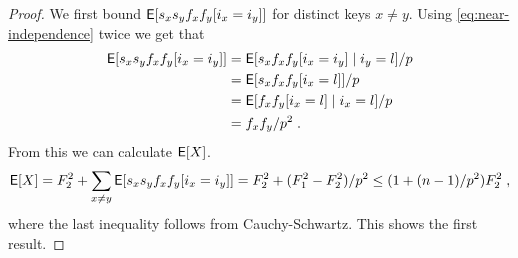\begin{proof}
    We first bound $\operatorname*{\sf{E}}[s_x s_y f_x f_y [i_x = i_y]]$ for distinct keys
    $x \neq y$. Using \cref{eq:near-independence} twice we get that
    \begin{equation}\begin{split}\label{eq:twice-split}
        \operatorname*{\sf{E}}[s_x s_y f_x f_y [i_x = i_y]]
            &= \operatorname*{\sf{E}}[s_x f_x f_y [i_x = i_y] \mid i_y = l]/p
            \\&= \operatorname*{\sf{E}}[s_x f_x f_y [i_x = l]]/p
            \\&= \operatorname*{\sf{E}}[f_x f_y [i_x = l] \mid i_x = l]/p
            \\&= f_x f_y / p^2 \; .
    \end{split}\end{equation}
    From this we can calculate $\operatorname*{\sf{E}}[X]$.
    \begin{align*}
        \operatorname*{\sf{E}}[X]
            = F_2^2 + \sum_{x \neq y} \operatorname*{\sf{E}}[s_x s_y f_x f_y [i_x = i_y]]
            = F_2^2 + (F_1^2 - F_2^2)/p^2
            \le (1 + (n - 1)/p^2)F_2^2 \; ,
    \end{align*}
    where the last inequality follows from Cauchy-Schwartz. This shows the first result.


\end{proof}
